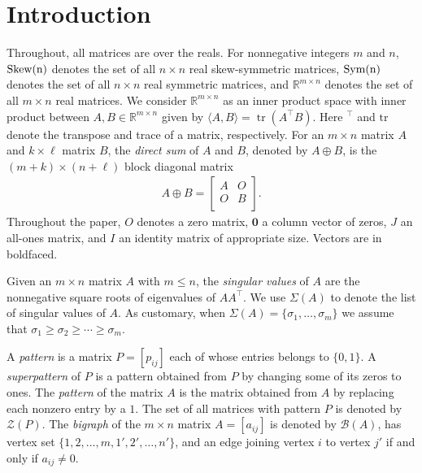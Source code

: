 \documentclass[preprint,12pt]{elsarticle}
\newcommand{\trans  }{^\top}
\newcommand{\Z}{\mathcal{Z}}
\newcommand{\skw}{\rm Skew}
\newcommand{\sym}{\rm Sym}
\newcommand{\mat}{\mathbb{R}}
\DeclareMathOperator{\tr}{tr}
\begin{document}
\section{Introduction}
Throughout, all matrices are over the reals. For nonnegative integers $m$ and $n$,  $\skw (n)$ denotes the
set of all $n \times n$ real skew-symmetric matrices,  $\sym(n)$ denotes the set of all
$n\times n$ real symmetric matrices, and  $\mat^{m\times n}$ denotes the set of all $m \times n$ real
matrices. We consider $\mat^{m\times n}$ as an inner product space with inner product
between $A,B \in \mat^{m\times n}$ given by $\langle A, B\rangle = \tr(A\trans  B)$. 
Here $\trans$ and $\mbox{tr}$ denote the transpose and trace of a matrix, respectively. For an $m\times n$ matrix $A$ and $k \times \ell$ matrix $B$, the \textit{direct sum} of $A$ and $B$, denoted by  $A \oplus B$, is the $(m + k) \times (n+ \ell)$ block diagonal matrix
\begin{align*}
    A \oplus B = \begin{bmatrix}
        A & O\\
        O & B\\
    \end{bmatrix}.
\end{align*}
Throughout the paper, $O$
denotes a zero matrix, $\mathbf 0$ a column vector of zeros,
$J$ an all-ones matrix, and $I$ an identity matrix of appropriate 
size.  Vectors are in boldfaced.

Given an $m\times n$ matrix $A$ with $m\leq n$, 
the {\it singular values} of $A$ are the nonnegative square roots of  eigenvalues of $AA\trans$.  
We use $\Sigma(A)$ to denote the list of singular values of $A$.
As customary, when $\Sigma(A)= \{ \sigma_1, \ldots, \sigma_m\}$ we assume that  $\sigma_1 \geq \sigma_2 \geq \cdots \geq \sigma_m$. 

A \textit{pattern} is a matrix $P=[p_{ij}]$ each of whose entries belongs to $\{0,1\}$.
A \textit{superpattern} of $P$ is 
a pattern obtained from $P$ by changing some of its zeros to ones. 
The \textit{pattern} of the matrix $A$ is the matrix obtained from $A$ by replacing 
each nonzero entry by a $1$.  The set of all matrices with  pattern $P$ is 
denoted by $\Z(P)$. 
The {\it bigraph} of the $m\times n$ matrix $A=[a_{ij}]$ is denoted by 
$\mathcal{B}(A)$, has vertex set $\{1,2,\ldots, m,1',2', \ldots, n'\}$, and an edge joining vertex $i$ to vertex $j'$ if and only if $a_{ij}\neq 0$.
\end{document}
